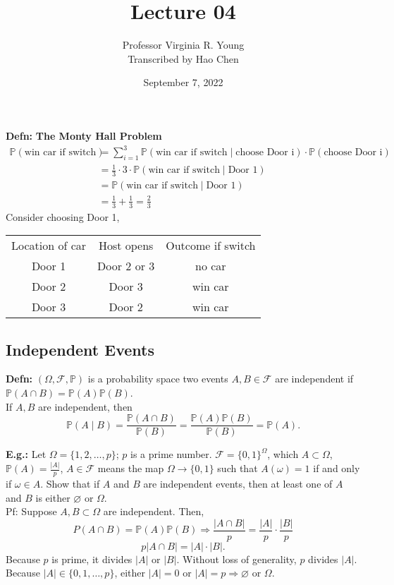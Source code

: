 \documentclass[a4paper]{article}
\title{Lecture 04}
\author{Professor Virginia R. Young\\ \small{Transcribed by Hao Chen}}
\date{September 7, 2022}
\newcommand{\n}{\hfill\break}
\newcommand{\defn}[1]{\par\noindent\settowidth{\hangindent}{\textbf{Defn: }}\textbf{Defn: }#1\n}
\newcommand{\eg}[1]{\par\noindent\settowidth{\hangindent}{\textbf{E.g.: }}\textbf{E.g.: }#1\n}
\newcommand{\F}{\mathcal F}
\newcommand{\Prob}{\mathbb{P}}
\renewcommand{\P}{\Prob}
\begin{document}
\maketitle

\defn{\textbf{The Monty Hall Problem}
\begin{align*}
    \P(\text{win car if switch})&=\sum^3_{i=1}\P(\text{win car if switch}\mid\text{choose Door i})\cdot\P(\text{choose Door i}) \\ 
    &=\frac{1}{3}\cdot3\cdot\P(\text{win car if switch}\mid\text{Door 1}) \\
    &=\P(\text{win car if switch}\mid\text{Door 1}) \\
    &=\frac{1}{3}+\frac{1}{3}=\frac{2}{3}
\end{align*}
Consider choosing Door 1, 

\begin{center}
\begin{tabular}{c c c}
Location of car & Host opens  & Outcome if switch \\
Door 1          & Door 2 or 3 & no car            \\
Door 2          & Door 3      & win car           \\
Door 3          & Door 2      & win car          
\end{tabular}
\end{center}
}

\subsection*{Independent Events}

\defn{ $(\Omega, \F, \P)$ is a probability space two events $A, B\in\F$ are independent if $\P(A\cap B)=\P(A)\P(B)$. \\
If $A, B$ are independent, then \[\P(A\mid B)=\frac{\P(A\cap B)}{\P(B)}=\frac{\P(A)\P(B)}{\P(B)}=\P(A).\]
}

\eg{Let $\Omega=\{1, 2, \dots, p\}$; $p$ is a prime number. $\F=\{0, 1\}^\Omega$, which $A\subset\Omega$, $\P(A)=\frac{|A|}{p}$, $A\in\F$ means the map $\Omega\rightarrow\{0, 1\}$ such that $A(\omega)=1$ if and only if $\omega\in A$. Show that if $A$ and $B$ are independent events, then at least one of $A$ and $B$ is either $\varnothing$ or $\Omega$.\\
Pf: Suppose $A, B\subset\Omega$ are independent. Then, 
\[P(A\cap B)=\P(A)\P(B)\Rightarrow \frac{|A\cap B|}{p}=\frac{|A|}{p}\cdot\frac{|B|}{p}\]
\[p|A\cap B|=|A|\cdot|B|.\]
Because $p$ is prime, it divides $|A|$ or $|B|$. Without loss of generality, $p$ divides $|A|$. Because $|A|\in\{0, 1, \dots, p\}$, either $|A|=0$ or $|A|=p\Rightarrow\varnothing$ or $\Omega$.
}
\end{document}
